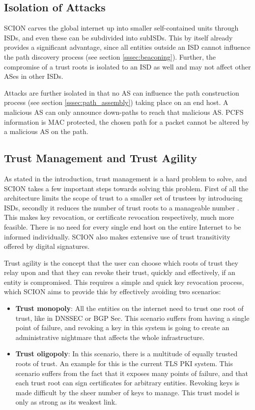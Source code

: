 \documentclass[../eva1_scion.tex]{subfiles}
\begin{document}
    \subsection{Isolation of Attacks}
    SCION carves the global internet up into smaller self-contained units through ISDs, and even these can be subdivided  into  subISDs. This by itself already provides a significant advantage, since all entities outside an ISD cannot influence the path discovery process (see section \ref{sssec:beaconing}). Further, the compromise of a trust roots is isolated to an ISD as well and may not affect other ASes in other ISDs.

    Attacks are further isolated in that no AS can influence the path construction process (see section \ref{sssec:path_assembly}) taking place on an end host. A malicious AS can only announce down-paths to reach that malicious AS. PCFS information is MAC protected, the chosen path for a packet cannot be altered by a malicious AS on the path. 

    \subsection{Trust Management and Trust Agility}
    As stated in the introduction, trust management is a hard problem to solve, and SCION takes a few important steps towards solving this problem. First of all the architecture limits the scope of trust to a smaller set of trustees by introducing ISDs, secondly it reduces the number of trust roots to a manageable number \cite{scion_2011}. This makes key revocation, or certificate revocation respectively, much more feasible.  There is no need for every single end host on the entire Internet to be informed individually. SCION also makes extensive use of trust transitivity offered by digital signatures.

    Trust agility is the concept that the user can choose which roots of trust they relay upon and that they can revoke their trust, quickly and effectively, if an entity is compromised. This requires a simple and quick key revocation process, which SCION aims to provide this by effectively avoiding two scenarios:

    \begin{itemize}
        \item \textbf{Trust monopoly}: All the entities on the internet need to trust one root of trust, like in DNSSEC or BGP Sec. This scenario suffers from having a single point of failure, and revoking a key in this system is going to create an administrative nightmare that affects the whole infrastructure.
        \item  \textbf{Trust oligopoly}: In this scenario, there is a multitude of equally trusted roots of trust. An example for this is the current  TLS PKI system. This scenario suffers from the fact that it exposes many points of failure, and that each trust root can sign certificates for arbitrary entities. Revoking keys is made difficult by the sheer number of keys to manage. This trust model is only as strong as its weakest link.
    \end{itemize}
\end{document}
